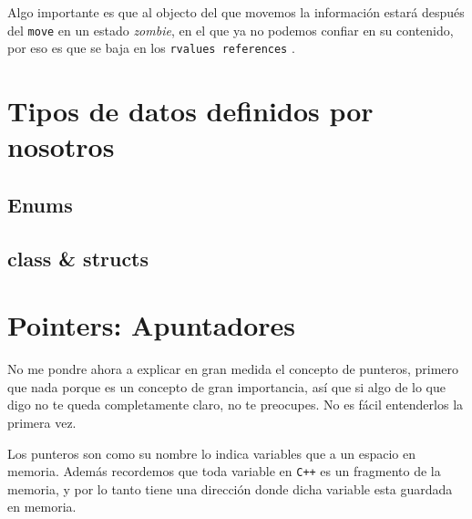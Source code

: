 \documentclass[12pt, fleqn]{report}                             %
\newcommand \Quote              {\qq}                           %
\theoremstyle{break}                                            %
\newcommand{\textCode}[1]  { \texttt{#1} }                      %
\newcommand \Cpp  {\textCode{C++} }                               %
\begin{document}
            Algo importante es que al objecto del que movemos la información estará después del
            \textCode{move} en un estado \emph{zombie}, en el que ya no podemos confiar en su contenido, 
            por eso es que se baja en los \textCode{rvalues references}.
            


           
                

        \clearpage
        \section{Tipos de datos definidos por nosotros}


            \subsection{Enums}

            \subsection{class \& structs}


        

        \clearpage
        \section{Pointers: Apuntadores}

            No me pondre ahora a explicar en gran medida el concepto de punteros, 
            primero que nada porque es un concepto de gran importancia, así que si algo de lo que
            digo no te queda completamente claro, no te preocupes. No es fácil entenderlos la primera vez.

            Los punteros son como su nombre lo indica variables que \Quote{apuntan} a un espacio en memoria.
            Además recordemos que toda variable en \Cpp es un fragmento de la memoria, y por lo tanto tiene
            una dirección donde dicha variable esta guardada en memoria.
\end{document}
